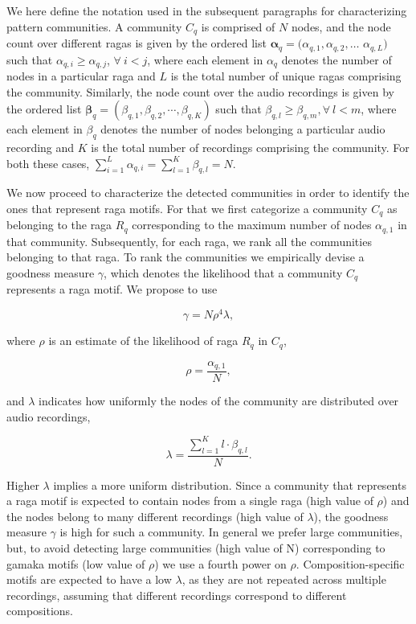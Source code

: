{We here define the notation used in the subsequent paragraphs for characterizing pattern communities. A community $C_q$ is comprised of $N$ nodes, and the node count over different \glspl{raga} is given by the ordered list ${\boldsymbol{\alpha}_q} = (\alpha_{q,1}, \alpha_{q,2},\dots$ $\alpha_{q,L})$ such that $\alpha_{q,i} \geq \alpha_{q,j}$, $\forall~ i < j$,
where each element in $\alpha_{q}$ denotes the number of nodes in a particular \gls{raga} and $L$ is the total number of unique \glspl{raga} comprising the community. Similarly, the node count over the audio recordings is given by the ordered list ${\boldsymbol{\beta}_q} = (\beta_{q,1}, \beta_{q,2},\cdots,\beta_{q,K})$ such that $\beta_{q,l} \geq \beta_{q,m}, \forall~l < m$,  where each element in $\beta_{q}$ denotes the number of nodes belonging a particular audio recording and $K$ is the total number of recordings comprising the community. For both these cases, $\sum_{i=1}^{L}\alpha_{q,i} = \sum_{l=1}^{K}\beta_{q,l} = N$.

We now proceed to characterize the detected communities in order to identify the ones that represent \gls{raga} motifs. For that we first categorize a community $C_q$ as belonging to the \gls{raga} $R_q$ corresponding to the maximum number of nodes $\alpha_{q,1}$ in that community. Subsequently, for each \gls{raga}, we rank all the communities belonging to that \gls{raga}. To rank the communities we empirically devise a goodness measure $\gamma$, which denotes the likelihood that a community $C_q$ represents a \gls{raga} motif. We propose to use

\begin{equation}
\gamma = N \rho^4 \lambda,
\label{eq:gamma_pattern_characterization}
\end{equation}

where $\rho$ is an estimate of the likelihood of \gls{raga} $R_q$ in $C_q$, 

\begin{equation}
\rho = \frac{\alpha_{q,1}}{N},
\end{equation}

and $\lambda$ indicates how uniformly the nodes of the community are distributed over audio recordings,

\begin{equation}
\lambda = \frac{\sum_{l=1}^{K}l \cdot \beta_{q,l}}{N}.
\end{equation}

Higher $\lambda$ implies a more uniform distribution. Since a community that represents a \gls{raga} motif is expected to contain nodes from a single \gls{raga} (high value of $\rho$) and the nodes belong to many different recordings (high value of $\lambda$), the goodness measure $\gamma$ is high for such a community. In general we prefer large communities, but, to avoid detecting large communities (high value of N) corresponding to \gls{gamaka} motifs (low value of $\rho$) we use a fourth power on $\rho$. Composition-specific motifs are expected to have a low $\lambda$, as they are not repeated across multiple recordings, assuming that different recordings correspond to different compositions. 

}
